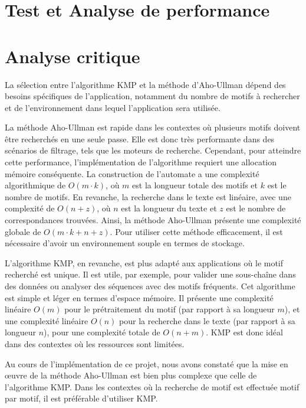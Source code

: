 \documentclass{article}
\begin{document}
\section{Test et Analyse de performance}

\newpage
\section{Analyse critique}
La sélection entre l'algorithme KMP et la méthode d’Aho-Ullman dépend des besoins spécifiques de l’application, notamment du nombre de motifs à rechercher et de l’environnement dans lequel l’application sera utilisée.

La méthode Aho-Ullman est rapide dans les contextes où plusieurs motifs doivent être recherchés en une seule passe. Elle est donc très performante dans des scénarios de filtrage, tels que les moteurs de recherche. Cependant, pour atteindre cette performance, l’implémentation de l’algorithme requiert une allocation mémoire conséquente. La construction de l’automate a une complexité algorithmique de \( O(m \cdot k) \), où \( m \) est la longueur totale des motifs et \( k \) est le nombre de motifs. En revanche, la recherche dans le texte est linéaire, avec une complexité de \( O(n + z) \), où \( n \) est la longueur du texte et \( z \) est le nombre de correspondances trouvées. Ainsi, la méthode Aho-Ullman présente une complexité globale de \( O(m \cdot k + n + z) \). Pour utiliser cette méthode efficacement, il est nécessaire d’avoir un environnement souple en termes de stockage.

L’algorithme KMP, en revanche, est plus adapté aux applications où le motif recherché est unique. Il est utile, par exemple, pour valider une sous-chaîne dans des données ou analyser des séquences avec des motifs fréquents. Cet algorithme est simple et léger en termes d’espace mémoire. Il présente une complexité linéaire \( O(m) \) pour le prétraitement du motif (par rapport à sa longueur \( m \)), et une complexité linéaire \( O(n) \) pour la recherche dans le texte (par rapport à sa longueur \( n \)), pour une complexité totale de \( O(n + m) \). KMP est donc idéal dans des contextes où les ressources sont limitées.

Au cours de l'implémentation de ce projet, nous avons constaté que la mise en œuvre de la méthode Aho-Ullman est bien plus complexe que celle de l’algorithme KMP. Dans les contextes où la recherche de motif est effectuée motif par motif, il est préférable d’utiliser KMP.
\end{document}
